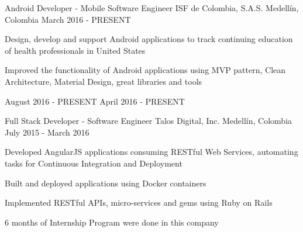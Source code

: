 \begin{cventries}
  \cventry
    {Android Developer - Mobile Software Engineer}
    {ISF de Colombia, S.A.S.}
    {Medellín, Colombia}
    {March 2016 - PRESENT}
    {
      \begin{cvitems}
        \item {Design, develop and support Android applications to track continuing education of
               health professionals in United States}
        \item {Improved the functionality of Android applications using MVP pattern, Clean
               Architecture, Material Design, great libraries and tools}
      \end{cvitems}
      \begin{cvsubentries}
                      {August 2016 - PRESENT}{}
                      {April 2016 - PRESENT}{}
      \end{cvsubentries}
    }
  \cventry
    {Full Stack Developer - Software Engineer}
    {Talos Digital, Inc.}
    {Medellín, Colombia}
    {July 2015 - March 2016}
    {
      \begin{cvitems}
        \item {Developed AngularJS applications consuming RESTful Web Services, automating tasks
               for Continuous Integration and Deployment}
        \item {Built and deployed applications using Docker containers}
        \item {Implemented RESTful APIs, micro-services and gems using Ruby on Rails}
        \item {6 months of Internship Program were done in this company}
      \end{cvitems}
      \begin{cvsubentries}
\end{cvsubentries}}
\end{cventries}
